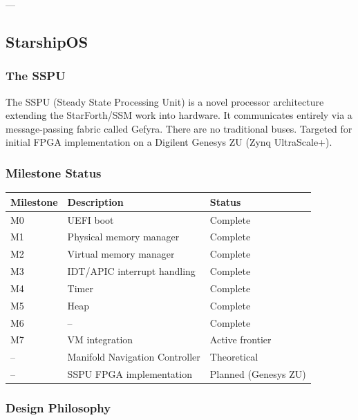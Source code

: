 ---

\subsection{StarshipOS}

\subsubsection{The SSPU}

The SSPU (Steady State Processing Unit) is a novel processor architecture
extending the StarForth/SSM work into hardware. It communicates entirely via
a message-passing fabric called Gefyra. There are no traditional buses.
Targeted for initial FPGA implementation on a Digilent Genesys ZU
(Zynq UltraScale+).


\subsubsection{Milestone Status}

\begin{center}
\begin{tabular}{lll}
\toprule
Milestone & Description & Status \\
\midrule
M0 & UEFI boot                        & Complete \\
M1 & Physical memory manager          & Complete \\
M2 & Virtual memory manager           & Complete \\
M3 & IDT/APIC interrupt handling       & Complete \\
M4 & Timer                            & Complete \\
M5 & Heap                             & Complete \\
M6 & --                               & Complete \\
M7 & VM integration                   & Active frontier \\
-- & Manifold Navigation Controller   & Theoretical \\
-- & SSPU FPGA implementation         & Planned (Genesys ZU) \\
\bottomrule
\end{tabular}
\end{center}

\subsubsection{Design Philosophy}

